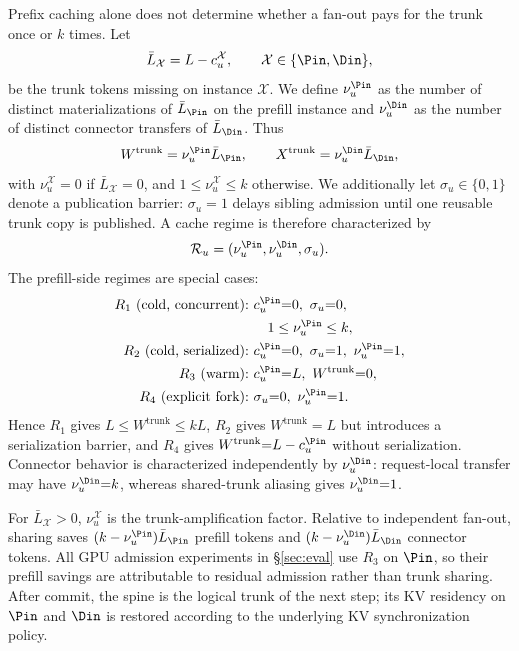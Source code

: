 Prefix caching alone does not determine whether a fan-out pays for the trunk once or $k$ times.
Let
\begin{equation}
\label{eq:lbar}
\bar L_{\mathcal{X}}=L-c_u^{\mathcal{X}},\qquad \mathcal{X}\in\{\Pin,\Din\},
\end{equation}
be the trunk tokens missing on instance $\mathcal{X}$.
We define $\nu_u^{\Pin}$ as the number of distinct materializations of $\bar L_{\Pin}$ on the prefill instance and $\nu_u^{\Din}$ as the number of distinct connector transfers of $\bar L_{\Din}$.
Thus
\begin{equation}
\label{eq:amp}
W^{\mathrm{trunk}}=\nu_u^{\Pin}\bar L_{\Pin},\qquad
X^{\mathrm{trunk}}=\nu_u^{\Din}\bar L_{\Din},
\end{equation}
with $\nu_u^{\mathcal{X}}{=}0$ if $\bar L_{\mathcal{X}}{=}0$, and $1\le\nu_u^{\mathcal{X}}\le k$ otherwise.
We additionally let $\sigma_u\in\{0,1\}$ denote a publication barrier: $\sigma_u{=}1$ delays sibling admission until one reusable trunk copy is published.
A cache regime is therefore characterized by
\begin{equation}
\label{eq:regime}
\mathcal{R}_u=(\nu_u^{\Pin},\nu_u^{\Din},\sigma_u).
\end{equation}
The prefill-side regimes are special cases:
\begin{equation}
\label{eq:rlist}
\begin{aligned}
R_1\ \text{(cold, concurrent):}\ &
  c_u^{\Pin}{=}0,\ \sigma_u{=}0,\\
&\quad 1\le\nu_u^{\Pin}\le k,\\
R_2\ \text{(cold, serialized):}\ &
  c_u^{\Pin}{=}0,\ \sigma_u{=}1,\ \nu_u^{\Pin}{=}1,\\
R_3\ \text{(warm):}\ &
  c_u^{\Pin}{=}L,\ W^{\mathrm{trunk}}{=}0,\\
R_4\ \text{(explicit fork):}\ &
  \sigma_u{=}0,\ \nu_u^{\Pin}{=}1.
\end{aligned}
\end{equation}
Hence $R_1$ gives $L\le W^{\mathrm{trunk}}\le kL$, $R_2$ gives $W^{\mathrm{trunk}}{=}L$ but introduces a serialization barrier, and $R_4$ gives $W^{\mathrm{trunk}}{=}L-c_u^{\Pin}$ without serialization.
Connector behavior is characterized independently by $\nu_u^{\Din}$: request-local transfer may have $\nu_u^{\Din}{=}k$, whereas shared-trunk aliasing gives $\nu_u^{\Din}{=}1$.

For $\bar L_{\mathcal{X}}>0$, $\nu_u^{\mathcal{X}}$ is the trunk-amplification factor.
Relative to independent fan-out, sharing saves $(k-\nu_u^{\Pin})\bar L_{\Pin}$ prefill tokens and $(k-\nu_u^{\Din})\bar L_{\Din}$ connector tokens.
All GPU admission experiments in \S\ref{sec:eval} use $R_3$ on $\Pin$, so their prefill savings are attributable to residual admission rather than trunk sharing.
After commit, the spine is the logical trunk of the next step; its KV residency on $\Pin$ and $\Din$ is restored according to the underlying KV synchronization policy.

